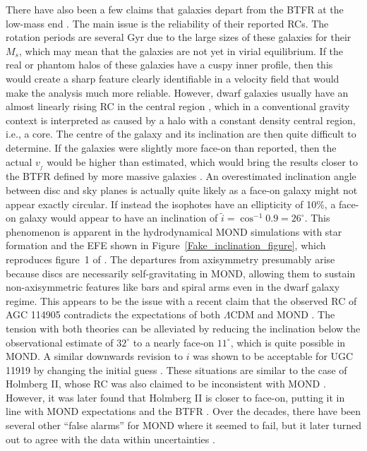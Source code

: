 \documentclass[fleqn,usenatbib,useAMS,onecolumn]{mnras} %
\begin{document}
There have also been a few claims that galaxies depart from the BTFR at the low-mass end \citep[e.g.][]{Mancera_2019, Mancera_2020}. The main issue is the reliability of their reported RCs. The rotation periods are several Gyr due to the large sizes of these galaxies for their $M_s$, which may mean that the galaxies are not yet in virial equilibrium. If the real or phantom halos of these galaxies have a cuspy inner profile, then this would create a sharp feature clearly identifiable in a velocity field that would make the analysis much more reliable. However, dwarf galaxies usually have an almost linearly rising RC in the central region \citep[e.g.][]{Neil_2000}, which in a conventional gravity context is interpreted as caused by a halo with a constant density central region, i.e., a core. The centre of the galaxy and its inclination are then quite difficult to determine. If the galaxies were slightly more face-on than reported, then the actual $v_{_f}$ would be higher than estimated, which would bring the results closer to the BTFR defined by more massive galaxies \citep[see figure~9 of][]{Mancera_2020}. An overestimated inclination angle between disc and sky planes is actually quite likely as a face-on galaxy might not appear exactly circular. If instead the isophotes have an ellipticity of 10\%, a face-on galaxy would appear to have an inclination of $\widetilde{i} = \cos^{-1} 0.9 = 26^\circ$. This phenomenon is apparent in the hydrodynamical MOND simulations with star formation and the EFE shown in Figure~\ref{Fake_inclination_figure}, which reproduces figure~1 of \citet{Banik_2022_fake_inclination}. The departures from axisymmetry presumably arise because discs are necessarily self-gravitating in MOND, allowing them to sustain non-axisymmetric features like bars and spiral arms even in the dwarf galaxy regime. This appears to be the issue with a recent claim that the observed RC of AGC 114905 contradicts the expectations of both $\Lambda$CDM and MOND \citep{Mancera_2022}. The tension with both theories can be alleviated by reducing the inclination below the observational estimate of $32^\circ$ to a nearly face-on $11^\circ$, which is quite possible in MOND. A similar downwards revision to $i$ was shown to be acceptable for UGC 11919 by changing the initial guess \citep{Saburova_2015}. These situations are similar to the case of Holmberg II, whose RC was also claimed to be inconsistent with MOND \citep{Oh_2011}. However, it was later found that Holmberg II is closer to face-on, putting it in line with MOND expectations and the BTFR \citep{Gentile_2012}. Over the decades, there have been several other ``false alarms'' for MOND where it seemed to fail, but it later turned out to agree with the data within uncertainties \citep[e.g.][and references therein]{Famaey_2013}.
\end{document}

